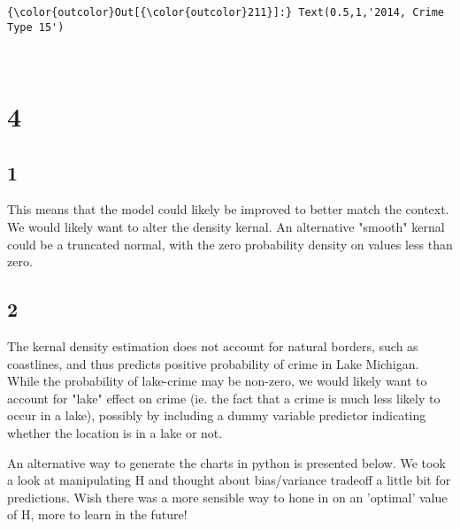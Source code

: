 \documentclass[11pt]{article}
\begin{document}
\begin{Verbatim}[commandchars=\\\{\}]
{\color{outcolor}Out[{\color{outcolor}211}]:} Text(0.5,1,'2014, Crime Type 15')
\end{Verbatim}
            
    \begin{center}
    \end{center}
    { \hspace*{\fill} \\}
    
    \section{4}\label{section}

\subsection{1}\label{section-1}

This means that the model could likely be improved to better match the
context. We would likely want to alter the density kernal. An
alternative "smooth" kernal could be a truncated normal, with the zero
probability density on values less than zero.

\subsection{2}\label{section-2}

The kernal density estimation does not account for natural borders, such
as coastlines, and thus predicts positive probability of crime in Lake
Michigan. While the probability of lake-crime may be non-zero, we would
likely want to account for "lake" effect on crime (ie. the fact that a
crime is much less likely to occur in a lake), possibly by including a
dummy variable predictor indicating whether the location is in a lake or
not.

    An alternative way to generate the charts in python is presented below.
We took a look at manipulating H and thought about bias/variance
tradeoff a little bit for predictions. Wish there was a more sensible
way to hone in on an 'optimal' value of H, more to learn in the future!
\end{document}
